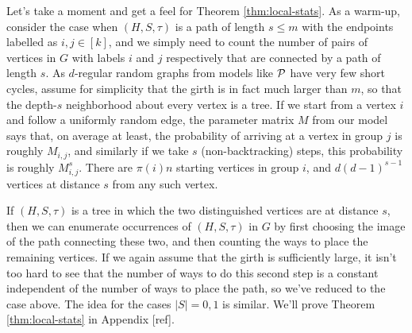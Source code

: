 \begin{lemma}
Let's take a moment and get a feel for Theorem \ref{thm:local-stats}. As a warm-up, consider the case when $(H,S,\tau)$ is a path of length $s \le m$ with the endpoints labelled as $i,j\in [k]$, and we simply need to count the number of pairs of vertices in $G$ with labels $i$ and $j$ respectively that are connected by a path of length $s$. As $d$-regular random graphs from models like $\mathcal{P}$ have very few short cycles, assume for simplicity that the girth is in fact much larger than $m$, so that the depth-$s$ neighborhood about every vertex is a tree. If we start from a vertex $i$ and follow a uniformly random edge, the parameter matrix $M$ from our model says that, on average at least, the probability of arriving at a vertex in group $j$ is roughly $M_{i,j}$, and similarly if we take $s$ (non-backtracking) steps, this probability is roughly $M^s_{i,j}$. There are $\pi(i) n$ starting vertices in group $i$, and $d(d-1)^{s-1}$ vertices at distance $s$ from any such vertex. 

If $(H,S,\tau)$ is a tree in which the two distinguished vertices are at distance $s$, then we can enumerate occurrences of $(H,S,\tau)$ in $G$ by first choosing the image of the path connecting these two, and then counting the ways to place the remaining vertices. If we again assume that the girth is sufficiently large, it isn't too hard to see that the number of ways to do this second step is a constant independent of the number of ways to place the path, so we've reduced to the case above. The idea for the cases $|S| = 0,1$ is similar. We'll prove Theorem \ref{thm:local-stats} in Appendix [ref].





\end{lemma}
